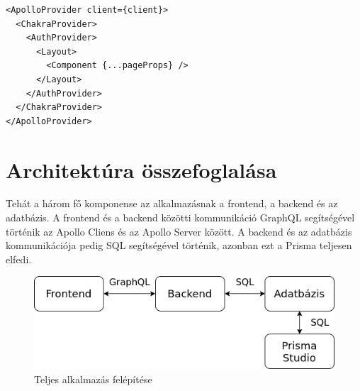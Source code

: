 \begin{lstlisting}[style=ES6, caption=Frontend-hez használt provider-ek]    
<ApolloProvider client={client}>
  <ChakraProvider>
    <AuthProvider>
      <Layout>
        <Component {...pageProps} />
      </Layout>
    </AuthProvider>
  </ChakraProvider>
</ApolloProvider>
\end{lstlisting}


\section{Architektúra összefoglalása}
Tehát a három fő komponense az alkalmazásnak a frontend, a backend és az adatbázis.
A frontend és a backend közötti kommunikáció GraphQL segítségével történik az Apollo Cliens és az Apollo Server között.
A backend és az adatbázis kommunikációja pedig SQL segítségével történik, azonban ezt a Prisma teljesen elfedi.

\begin{figure}[!ht]
  \centering
  \includegraphics[width=150mm, keepaspectratio]{figures/architecture.png}
  \caption{Teljes alkalmazás felépítése}
  \label{fig:architecture}
\end{figure}